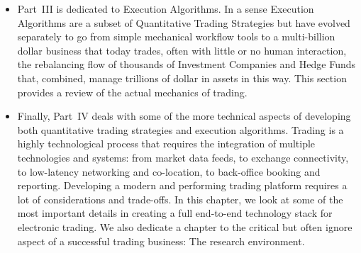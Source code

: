 \begin{itemize}
\item Part~III is dedicated to Execution Algorithms. In a sense Execution Algorithms are a subset of Quantitative Trading Strategies but have evolved separately to go from simple mechanical workflow tools to a multi-billion dollar business that today trades, often with little or no human interaction, the rebalancing flow of thousands of Investment Companies and Hedge Funds that, combined, manage trillions of dollar in assets in this way. This section provides a review of the actual mechanics of trading. 

\item Finally, Part~IV deals with some  of the more technical aspects of developing both quantitative trading strategies and execution algorithms. Trading is a highly technological process that requires the integration of multiple technologies and systems: from market data feeds, to exchange connectivity, to low-latency networking and co-location, to back-office booking and reporting. Developing a modern and performing trading platform requires a lot of considerations and trade-offs. In this chapter, we look at some of the most important details in creating a full end-to-end technology stack for electronic trading. We also dedicate a chapter to the critical but often ignore aspect of a successful trading business: The research environment.
\end{itemize} 
